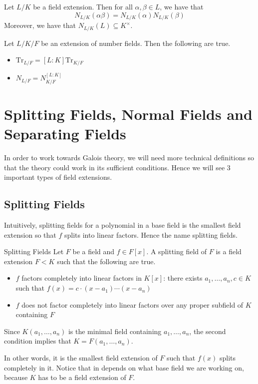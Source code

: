 \documentclass[a4paper]{article}
\begin{document}
\begin{lmm}{}{} Let $L/K$ be a field extension. Then for all $\alpha,\beta\in L$, we have that $$N_{L/K}(\alpha\beta)=N_{L/K}(\alpha)N_{L/K}(\beta)$$ Moreover, we have that $N_{L/K}(L)\subseteq K^\times$. 
\end{lmm}

\begin{crl}{}{} Let $L/K/F$ be an extension of number fields. Then the following are true. 
\begin{itemize}
\item $\text{Tr}_{L/F}=[L:K]\text{Tr}_{K/F}$
\item $N_{L/F}=N_{K/F}^{[L:K]}$
\end{itemize}
\end{crl}

\pagebreak
\section{Splitting Fields, Normal Fields and Separating Fields}
In order to work towards Galois theory, we will need more technical definitions so that the theory could work in its sufficient conditions. Hence we will see $3$ important types of field extensions. 

\subsection{Splitting Fields}
Intuitively, splitting fields for a polynomial in a base field is the smallest field extension so that $f$ splits into linear factors. Hence the name splitting fields. 

\begin{defn}{Splitting Fields}{} Let $F$ be a field and $f\in F[x]$. A splitting field of $F$ is a field extension $F<K$ such that the following are true. 
\begin{itemize}
\item $f$ factors completely into linear factors in $K[x]$: there exists $a_1,\dots,a_n,c\in K$ such that $f(x)=c\cdot (x-a_1)\cdots(x-a_n)$
\item $f$ does not factor completely into linear factors over any proper subfield of $K$ containing $F$
\end{itemize}
Since $K(a_1,\dots,a_n)$ is the minimal field containing $a_1,\dots,a_n$, the second condition implies that $K=F(a_1,\dots,a_n)$. 
\end{defn}

In other words, it is the smallest field extension of $F$ such that $f(x)$ splits completely in it. Notice that in depends on what base field we are working on, because $K$ has to be a field extension of $F$. \\~\\
\end{document}
